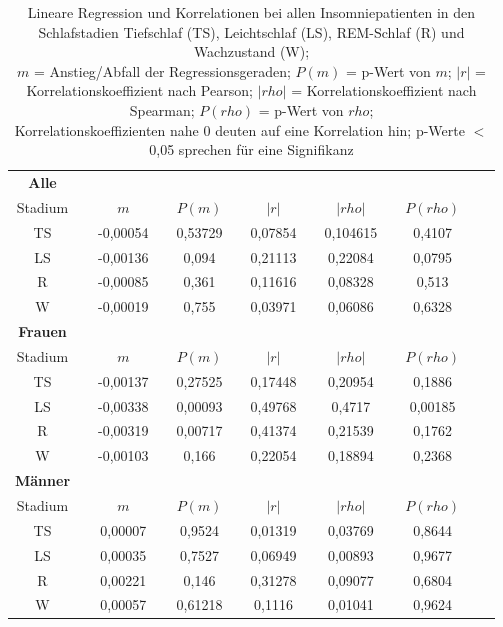 \begin{table}[H] 
\centering
\begin{tabularx}{0.85\textwidth}{ccccccccccccc}
\toprule
\textbf{Alle} & & & & & & & & & & & &\\  
\cmidrule{1-1}
Stadium & & $m$ & & $P(m)$ & & $|r|$ & & $|rho|$ & & $P(rho)$\\
\midrule
TS & & -0,00054 & & 0,53729 & & 0,07854 & & 0,104615 & & 0,4107\\
LS & & -0,00136 & & 0,094 & & 0,21113 & & 0,22084 & & 0,0795\\
R & & -0,00085 & & 0,361 & & 0,11616 & & 0,08328 & & 0,513\\
W & & -0,00019 & & 0,755 & & 0,03971 & & 0,06086 & & 0,6328\\
\midrule
\textbf{Frauen} & & & & & & & & & & & &\\  
\cmidrule{1-1}
Stadium & & $m$ & & $P(m)$ & & $|r|$ & & $|rho|$ & & $P(rho)$\\
\midrule
TS & & -0,00137 & & 0,27525 & & 0,17448 & & 0,20954 & & 0,1886\\
LS & & -0,00338 & & 0,00093 & & 0,49768 & & 0,4717 & & 0,00185\\
R & & -0,00319 & & 0,00717  & & 0,41374 & & 0,21539 & & 0,1762\\
W & & -0,00103 & & 0,166 & & 0,22054 & & 0,18894 & & 0,2368\\
\midrule
\textbf{Männer} & & & & & & & & & & & &\\  
\cmidrule{1-1}
Stadium & & $m$ & & $P(m)$ & & $|r|$ & & $|rho|$ & & $P(rho)$\\
\midrule
TS & & 0,00007 & & 0,9524 & & 0,01319 & & 0,03769 & & 0,8644\\
LS & & 0,00035 & & 0,7527 & & 0,06949 & & 0,00893 & & 0,9677\\
R & & 0,00221 & & 0,146 & & 0,31278 & & 0,09077 & & 0,6804\\
W & & 0,00057 & & 0,61218 & & 0,1116 & & 0,01041 & & 0,9624\\
\bottomrule
\end{tabularx}
\caption[Lineare Regression und Korrelationen bei allen Insomniepatienten]{Lineare Regression und Korrelationen bei allen Insomniepatienten in den Schlafstadien Tiefschlaf (TS), Leichtschlaf (LS), \acs{REM}-Schlaf (R) und Wachzustand (W);\\
$m$ = Anstieg/Abfall der Regressionsgeraden; $P(m)$ = p-Wert von $m$; $|r|$ = Korrelationskoeffizient nach Pearson; $|rho|$ = Korrelationskoeffizient nach Spearman; $P(rho)$ = p-Wert von $rho$;\\Korrelationskoeffizienten nahe 0 deuten auf eine Korrelation hin; p-Werte $<$ 0,05 sprechen für eine Signifikanz}
\label{tab:linregAlle}
\end{table}

